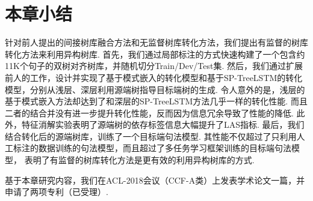 \section{本章小结}
针对前人提出的间接树库融合方法和无监督树库转化方法，我们提出有监督的树库转化方法来利用异构树库.
首先，我们通过局部标注的方式快速构建了一个包含约11K个句子的双树对齐树库，并随机切分Train/Dev/Test集.
然后，我们通过扩展前人的工作，设计并实现了基于模式嵌入的转化模型和基于SP-TreeLSTM的转化模型，分别从浅层、深层利用源端树指导目标端树的生成.
令人意外的是，浅层的基于模式嵌入方法却达到了和深层的SP-TreeLSTM方法几乎一样的转化性能. 而且二者的结合并没有进一步提升转化性能，反而因为信息冗余导致了性能的降低.
此外，特征消解实验表明了源端树的依存标签信息大幅提升了LAS指标.
最后，我们结合转化后的源端树库，训练了一个目标端句法模型. 其性能不仅超过了只利用人工标注的数据训练的句法模型，而且超过了多任务学习框架训练的目标端句法模型，
表明了有监督的树库转化方法是更有效的利用异构树库的方式.


基于本章研究内容，我们在ACL-2018会议（CCF-A类）上发表学术论文一篇，并申请了两项专利（已受理）.


